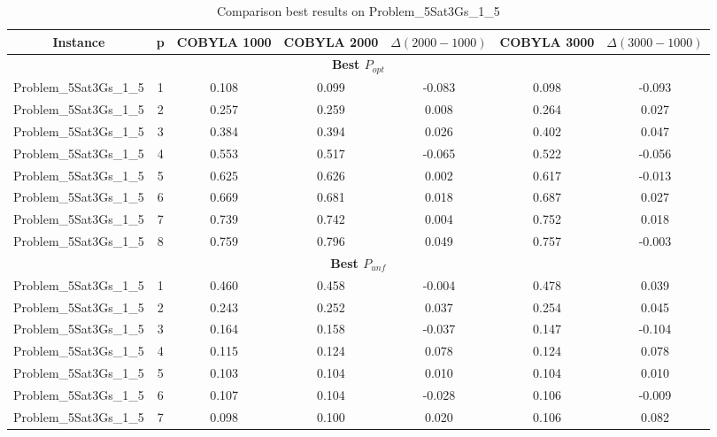\begin{table}[!htbp]
    \renewcommand{\arraystretch}{0.7}
    \scriptsize
    \centering
    \caption{Comparison best results on Problem\_5Sat3Gs\_1\_5}
    \begin{adjustbox}{max width=\columnwidth}
        \begin{tabularx}{\columnwidth}{c|c c c c c c}
            \toprule
            \textbf{Instance} & \textbf{p} & \textbf{COBYLA 1000} & \textbf{COBYLA 2000} & $\Delta(2000-1000)$ & \textbf{COBYLA 3000} & $\Delta(3000-1000)$ \\
            \midrule
            \multicolumn{7}{c}{\textbf{Best $P_{opt}$}} \\ \midrule
            Problem\_5Sat3Gs\_1\_5 & 1 & 0.108 & 0.099 & -0.083 & 0.098 & -0.093 \\
            Problem\_5Sat3Gs\_1\_5 & 2 & 0.257 & 0.259 & 0.008 & 0.264 & 0.027 \\
            Problem\_5Sat3Gs\_1\_5 & 3 & 0.384 & 0.394 & 0.026 & 0.402 & 0.047 \\
            Problem\_5Sat3Gs\_1\_5 & 4 & 0.553 & 0.517 & -0.065 & 0.522 & -0.056 \\
            Problem\_5Sat3Gs\_1\_5 & 5 & 0.625 & 0.626 & 0.002 & 0.617 & -0.013 \\
            Problem\_5Sat3Gs\_1\_5 & 6 & 0.669 & 0.681 & 0.018 & 0.687 & 0.027 \\
            Problem\_5Sat3Gs\_1\_5 & 7 & 0.739 & 0.742 & 0.004 & 0.752 & 0.018 \\
            Problem\_5Sat3Gs\_1\_5 & 8 & 0.759 & 0.796 & 0.049 & 0.757 & -0.003 \\
            \multicolumn{7}{c}{\textbf{Best $P_{unf}$}} \\ \midrule
            Problem\_5Sat3Gs\_1\_5 & 1 & 0.460 & 0.458 & -0.004 & 0.478 & 0.039 \\
            Problem\_5Sat3Gs\_1\_5 & 2 & 0.243 & 0.252 & 0.037 & 0.254 & 0.045 \\
            Problem\_5Sat3Gs\_1\_5 & 3 & 0.164 & 0.158 & -0.037 & 0.147 & -0.104 \\
            Problem\_5Sat3Gs\_1\_5 & 4 & 0.115 & 0.124 & 0.078 & 0.124 & 0.078 \\
            Problem\_5Sat3Gs\_1\_5 & 5 & 0.103 & 0.104 & 0.010 & 0.104 & 0.010 \\
            Problem\_5Sat3Gs\_1\_5 & 6 & 0.107 & 0.104 & -0.028 & 0.106 & -0.009 \\
            Problem\_5Sat3Gs\_1\_5 & 7 & 0.098 & 0.100 & 0.020 & 0.106 & 0.082 \\

\end{tabularx}
\end{adjustbox}
\end{table}
